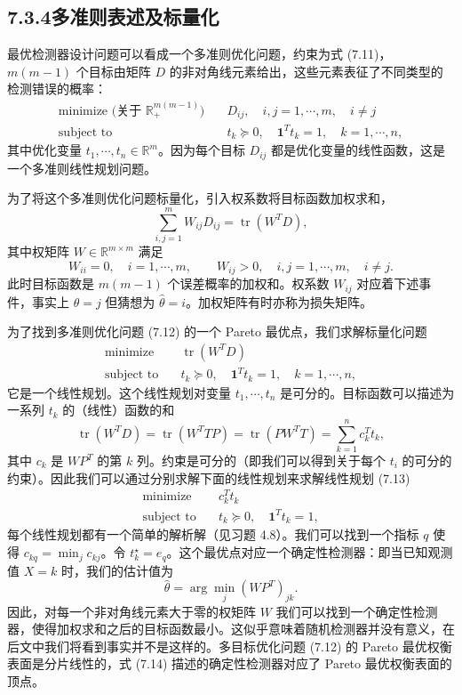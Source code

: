\documentclass[UTF8,12pt,a4paper,fontset=fandol]{ctexart}
\begin{document}
\subsection*{7.3.4\quad 多准则表述及标量化}

最优检测器设计问题可以看成一个多准则优化问题，约束为式 (7.11)，$m(m-1)$ 个目标由矩阵 $D$ 的非对角线元素给出，这些元素表征了不同类型的检测错误的概率：
\begin{equation}
\begin{aligned}
\text{minimize (关于 $\mathbb{R}_+^{m(m-1)}$)}\quad & D_{ij},\quad i,j=1,\cdots,m,\quad i\neq j\\
\text{subject to}\quad & t_k\succeq 0,\quad \mathbf{1}^Tt_k=1,\quad k=1,\cdots,n,
\end{aligned}
\tag{7.12}
\end{equation}
其中优化变量 $t_1,\cdots,t_n\in\mathbb{R}^m$。因为每个目标 $D_{ij}$ 都是优化变量的线性函数，这是一个多准则线性规划问题。

为了将这个多准则优化问题标量化，引入权系数将目标函数加权求和，
\[
\sum_{i,j=1}^m W_{ij}D_{ij}=\operatorname{tr}(W^TD),
\]
其中权矩阵 $W\in\mathbb{R}^{m\times m}$ 满足
\[
W_{ii}=0,\quad i=1,\cdots,m,\qquad
W_{ij}>0,\quad i,j=1,\cdots,m,\quad i\neq j.
\]
此时目标函数是 $m(m-1)$ 个误差概率的加权和。权系数 $W_{ij}$ 对应着下述事件，事实上 $\theta=j$ 但猜想为 $\hat{\theta}=i$。加权矩阵有时亦称为损失矩阵。

为了找到多准则优化问题 (7.12) 的一个 Pareto 最优点，我们求解标量化问题
\begin{equation}
\begin{aligned}
\text{minimize}\quad & \operatorname{tr}(W^TD)\\
\text{subject to}\quad & t_k\succeq 0,\quad \mathbf{1}^Tt_k=1,\quad k=1,\cdots,n,
\end{aligned}
\tag{7.13}
\end{equation}
它是一个线性规划。这个线性规划对变量 $t_1,\cdots,t_n$ 是可分的。目标函数可以描述为一系列 $t_k$ 的（线性）函数的和
\[
\operatorname{tr}(W^TD)=\operatorname{tr}(W^TTP)=\operatorname{tr}(PW^TT)=\sum_{k=1}^n c_k^Tt_k,
\]
其中 $c_k$ 是 $WP^T$ 的第 $k$ 列。约束是可分的（即我们可以得到关于每个 $t_i$ 的可分的约束）。因此我们可以通过分别求解下面的线性规划来求解线性规划 (7.13)
\[
\begin{aligned}
\text{minimize}\quad & c_k^Tt_k\\
\text{subject to}\quad & t_k\succeq 0,\quad \mathbf{1}^Tt_k=1,
\end{aligned}
\]
每个线性规划都有一个简单的解析解（见习题 4.8）。我们可以找到一个指标 $q$ 使得 $c_{kq}=\min_j c_{kj}$。令 $t_k^\star=e_q$。这个最优点对应一个确定性检测器：即当已知观测值 $X=k$ 时，我们的估计值为
\begin{equation}
\hat{\theta}=\arg\min_j(WP^T)_{jk}.
\tag{7.14}
\end{equation}
因此，对每一个非对角线元素大于零的权矩阵 $W$ 我们可以找到一个确定性检测器，使得加权求和之后的目标函数最小。这似乎意味着随机检测器并没有意义，在后文中我们将看到事实并不是这样的。多目标优化问题 (7.12) 的 Pareto 最优权衡表面是分片线性的，式 (7.14) 描述的确定性检测器对应了 Pareto 最优权衡表面的顶点。
\end{document}
